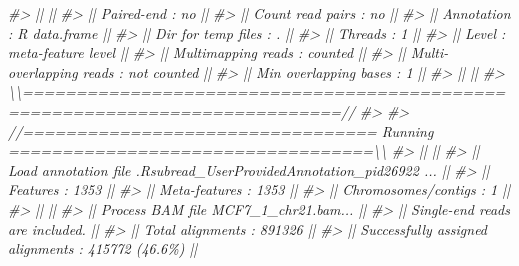 \documentclass[
]{article}
\newenvironment{Shaded}{\begin{snugshade}}{\end{snugshade}}
\newcommand{\CommentTok}[1]{\textcolor[rgb]{0.56,0.35,0.01}{\textit{#1}}}
\begin{document}
\begin{Shaded}
\begin{Highlighting}[]
\CommentTok{\#\textgreater{} ||                                                                            ||}
\CommentTok{\#\textgreater{} ||              Paired{-}end : no                                               ||}
\CommentTok{\#\textgreater{} ||        Count read pairs : no                                               ||}
\CommentTok{\#\textgreater{} ||              Annotation : R data.frame                                     ||}
\CommentTok{\#\textgreater{} ||      Dir for temp files : .                                                ||}
\CommentTok{\#\textgreater{} ||                 Threads : 1                                                ||}
\CommentTok{\#\textgreater{} ||                   Level : meta{-}feature level                               ||}
\CommentTok{\#\textgreater{} ||      Multimapping reads : counted                                          ||}
\CommentTok{\#\textgreater{} || Multi{-}overlapping reads : not counted                                      ||}
\CommentTok{\#\textgreater{} ||   Min overlapping bases : 1                                                ||}
\CommentTok{\#\textgreater{} ||                                                                            ||}
\CommentTok{\#\textgreater{} \textbackslash{}\textbackslash{}============================================================================//}
\CommentTok{\#\textgreater{} }
\CommentTok{\#\textgreater{} //================================= Running ==================================\textbackslash{}\textbackslash{}}
\CommentTok{\#\textgreater{} ||                                                                            ||}
\CommentTok{\#\textgreater{} || Load annotation file .Rsubread\_UserProvidedAnnotation\_pid26922 ...         ||}
\CommentTok{\#\textgreater{} ||    Features : 1353                                                         ||}
\CommentTok{\#\textgreater{} ||    Meta{-}features : 1353                                                    ||}
\CommentTok{\#\textgreater{} ||    Chromosomes/contigs : 1                                                 ||}
\CommentTok{\#\textgreater{} ||                                                                            ||}
\CommentTok{\#\textgreater{} || Process BAM file MCF7\_1\_chr21.bam...                                       ||}
\CommentTok{\#\textgreater{} ||    Single{-}end reads are included.                                          ||}
\CommentTok{\#\textgreater{} ||    Total alignments : 891326                                               ||}
\CommentTok{\#\textgreater{} ||    Successfully assigned alignments : 415772 (46.6\%)                       ||}

\end{Highlighting}
\end{Shaded}
\end{document}
